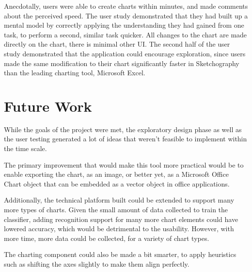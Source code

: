 	Anecdotally, users were able to create charts within minutes, and made comments about the perceived speed. The user study demonstrated that they had built up a mental model by correctly applying the understanding they had gained from one task, to perform a second, similar task quicker. All changes to the chart are made directly on the chart, there is minimal other UI. The second half of the user study demonstrated that the application could encourage exploration, since users made the same modification to their chart significantly faster in Sketchography than the leading charting tool, Microsoft Excel.
	
\section{Future Work}
While the goals of the project were met, the exploratory design phase as well as the user testing generated a lot of ideas that weren't feasible to implement within the time scale.

The primary improvement that would make this tool more practical would be to enable exporting the chart, as an image, or better yet, as a Microsoft Office Chart object that can be embedded as a vector object in office applications.

Additionally, the technical platform built could be extended to support many more types of charts. Given the small amount of data collected to train the classifier, adding recognition support for many more chart elements could have lowered accuracy, which would be detrimental to the usability. However, with more time, more data could be collected, for a variety of chart types.

The charting component could also be made a bit smarter, to apply heuristics such as shifting the axes slightly to make them align perfectly.
